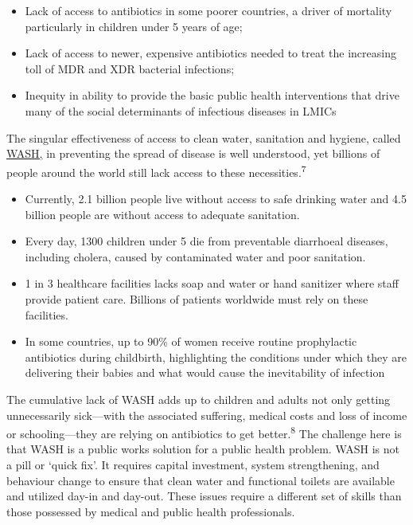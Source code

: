 \documentclass[
]{book}
\providecommand{\tightlist}{%
  \setlength{\itemsep}{0pt}\setlength{\parskip}{0pt}}
\begin{document}
\begin{itemize}
\tightlist
\item
  Lack of access to antibiotics in some poorer countries, a driver of mortality particularly in children under 5 years of age;
\item
  Lack of access to newer, expensive antibiotics needed to treat the increasing toll of MDR and XDR bacterial infections;
\item
  Inequity in ability to provide the basic public health interventions that drive many of the social determinants of infectious diseases in LMICs
\end{itemize}

The singular effectiveness of access to clean water, sanitation and hygiene, called \href{https://www.who.int/health-topics/water-sanitation-and-hygiene-wash}{WASH,} in preventing the spread of disease is well understood, yet billions of people around the world still lack access to these necessities.\textsuperscript{7}

\begin{itemize}
\tightlist
\item
  Currently, 2.1 billion people live without access to safe drinking water and 4.5 billion people are without access to adequate sanitation.
\item
  Every day, 1300 children under 5 die from preventable diarrhoeal diseases, including cholera, caused by contaminated water and poor sanitation.
\item
  1 in 3 healthcare facilities lacks soap and water or hand sanitizer where staff provide patient care. Billions of patients worldwide must rely on these facilities.
\item
  In some countries, up to 90\% of women receive routine prophylactic antibiotics during childbirth, highlighting the conditions under which they are delivering their babies and what would cause the inevitability of infection
\end{itemize}

The cumulative lack of WASH adds up to children and adults not only getting unnecessarily sick---with the associated suffering, medical costs and loss of income or schooling---they are relying on antibiotics to get better.\textsuperscript{8} The challenge here is that WASH is a public works solution for a public health problem. WASH is not a pill or `quick fix'. It requires capital investment, system strengthening, and behaviour change to ensure that clean water and functional toilets are available and utilized day-in and day-out. These issues require a different set of skills than those possessed by medical and public health professionals.
\end{document}

